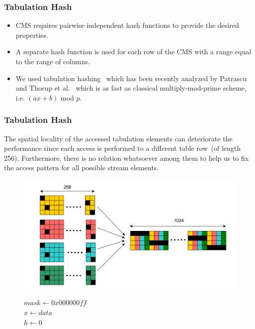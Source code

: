 \documentclass{beamer}
\begin{document}
\begin{frame}
\frametitle{Tabulation Hash}
\begin{itemize}
\item CMS requires pairwise independent hash functions to provide the desired properties.
\item A separate hash function is used for each row of the CMS with a range equal  to the range of columns. 
\item We used tabulation hashing~\cite{zobrist1970} which has been recently analyzed by Patrascu and Thorup et al.~\cite{patrascu2012,thorup2017} which is as fast as classical multiply-mod-prime scheme, i.e. $(ax+b)$ mod $p$.
\end{itemize}
\end{frame}

\begin{frame}
\frametitle{Tabulation Hash}
		The spatial locality of the accessed tabulation elements can deteriorate the performance since each access is performed to a different table row~(of length 256). 
		Furthermore, there is no relation whatsoever among them to help us to fix the access pattern for all possible stream elements.

 \begin{figure}[H]
	\begin{minipage}[c]{0.40\textwidth}
	\hspace*{3ex} \includegraphics[scale=0.45]{single_tabular_access.pdf}
	\end{minipage}\hfill\hfill\hfill
	\begin{minipage}[c]{0.5\textwidth}
		\renewcommand{\baselinestretch}{0.9}
		\begin{algorithm}[H]
			\tiny
			\SetAlgoNoLine
			$mask \leftarrow 0x000000ff$ \\
			$x \leftarrow data$ \\
			$h \leftarrow 0$ \\
		

\end{algorithm}
\end{minipage}
\end{figure}
\end{frame}
\end{document}
